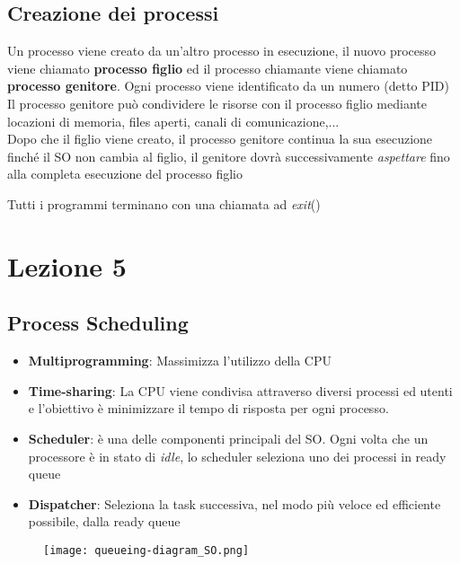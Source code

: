 \documentclass[12pt, a4paper]{article}
\begin{document}
	\subsection*{Creazione dei processi} 
	Un processo viene creato da un'altro processo in esecuzione, il nuovo processo viene chiamato \textbf{processo figlio} ed il processo chiamante viene chiamato \textbf{processo genitore}. Ogni processo viene identificato da un numero (detto PID)\\
	Il processo genitore può condividere le risorse con il processo figlio mediante locazioni di memoria, files aperti, canali di comunicazione,... \\
	Dopo che il figlio viene creato, il processo genitore continua la sua esecuzione finché il SO non cambia al figlio, il genitore dovrà successivamente \textit{aspettare} fino alla completa esecuzione del processo figlio
	
	Tutti i programmi terminano con una chiamata ad \textit{exit}()
	
	
	
	
	\section*{Lezione 5}
	
	\subsection*{Process Scheduling} 
	\begin{itemize}
		\item \textbf{Multiprogramming}: Massimizza l'utilizzo della CPU
		\item \textbf{Time-sharing}: La CPU viene condivisa attraverso diversi processi ed utenti e l'obiettivo è minimizzare il tempo di risposta per ogni processo.
		\item \textbf{Scheduler}: è una delle componenti principali del SO. Ogni volta che un processore è in stato di \textit{idle}, lo scheduler seleziona uno dei processi in ready queue
		\item \textbf{Dispatcher}: Seleziona la task successiva, nel modo più veloce ed efficiente possibile, dalla ready queue
	\end{itemize}

	\begin{figure}[!htbp]
		\centering
		\texttt{[image: queueing-diagram\_SO.png]}
		\caption*{}
		\label{fig:queueing-diagram}
	\end{figure}
	
\end{document}
